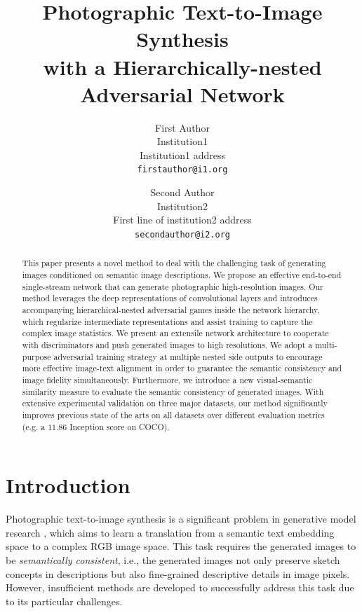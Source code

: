 \documentclass[10pt,twocolumn,letterpaper]{article}
\begin{document}
\title{Photographic Text-to-Image Synthesis \\ with a Hierarchically-nested Adversarial Network}

\author{First Author\\
Institution1\\
Institution1 address\\
{\tt\small firstauthor@i1.org}
\and
Second Author\\
Institution2\\
First line of institution2 address\\
{\tt\small secondauthor@i2.org}
}

\maketitle

\begin{abstract}
This paper presents a novel method to deal with the challenging task of generating images conditioned on semantic image descriptions. We propose an effective end-to-end single-stream network that can generate photographic high-resolution images. Our method leverages the deep representations of convolutional layers and introduces accompanying hierarchical-nested adversarial games inside the network hierarchy, which regularize intermediate representations and assist training to capture the complex image statistics. We present an extensile network architecture to cooperate with discriminators and push generated images to high resolutions. 
We adopt a multi-purpose adversarial training strategy at multiple nested side outputs to encourage more effective image-text alignment in order to guarantee the semantic consistency and image fidelity simultaneously. Furthermore, we introduce a new visual-semantic similarity measure to evaluate the semantic consistency of generated images.
With extensive experimental validation on three major datasets, our method significantly improves previous state of the arts on all datasets over different evaluation metrics (e.g. a ${11.86}$ Inception score on COCO). 
\end{abstract}


\section{Introduction}
Photographic text-to-image synthesis is a significant problem in generative model research \cite{reed2016generative}, which aims to learn a translation from a semantic text embedding space to a complex RGB image space. This task requires the generated images to be \textit{semantically consistent}, i.e., the generated images not only preserve sketch concepts in descriptions but also fine-grained descriptive details in image pixels. 
However, insufficient methods are developed to successfully address this task due to its particular challenges. 
\end{document}
